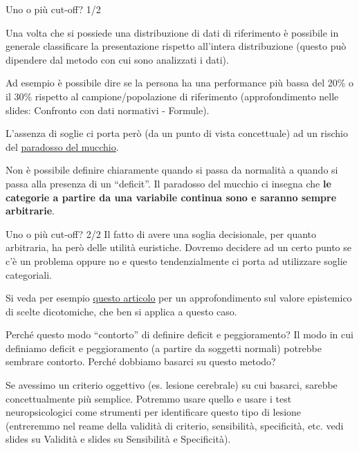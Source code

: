 \documentclass[
  ignorenonframetext,
  aspectratio=169,
]{beamer}
\begin{document}
\begin{frame}{Uno o più cut-off? 1/2}
\label{uno-o-piuxf9-cut-off-12}
\small

Una volta che si possiede una distribuzione di dati di riferimento è
possibile in generale classificare la presentazione rispetto all'intera
distribuzione (questo può dipendere dal metodo con cui sono analizzati i
dati).

Ad esempio è possibile dire se la persona ha una performance più bassa
del 20\% o il 30\% rispetto al campione/popolazione di riferimento
(approfondimento nelle slides: Confronto con dati normativi - Formule).

L'assenza di soglie ci porta però (da un punto di vista concettuale) ad
un rischio del
\href{https://it.wikipedia.org/wiki/Paradosso_del_sorite}{\ul{paradosso
del mucchio}}.

Non è possibile definire chiaramente quando si passa da normalità a
quando si passa alla presenza di un ``deficit''. Il paradosso del
mucchio ci insegna che \textbf{le categorie a partire da una variabile
continua sono e saranno sempre arbitrarie}.
\end{frame}

\begin{frame}{Uno o più cut-off? 2/2}
\label{uno-o-piuxf9-cut-off-22}
Il fatto di avere una soglia decisionale, per quanto arbitraria, ha però
delle utilità euristiche. Dovremo decidere ad un certo punto se c'è un
problema oppure no e questo tendenzialmente ci porta ad utilizzare
soglie categoriali.

Si veda per esempio
\href{https://journals.sagepub.com/doi/full/10.1177/09593543231160112}{\underline{questo articolo}}
per un approfondimento sul valore epistemico di scelte dicotomiche, che
ben si applica a questo caso.
\end{frame}

\begin{frame}{Perché questo modo ``contorto'' di definire deficit e
peggioramento?}
\label{perchuxe9-questo-modo-contorto-di-definire-deficit-e-peggioramento}
Il modo in cui definiamo deficit e peggioramento (a partire da soggetti
normali) potrebbe sembrare contorto. Perché dobbiamo basarci su questo
metodo?

Se avessimo un criterio oggettivo (es. lesione cerebrale) su cui
basarci, sarebbe concettualmente più semplice. Potremmo usare quello e
usare i test neuropsicologici come strumenti per identificare questo
tipo di lesione (entreremmo nel reame della validità di criterio,
sensibilità, specificità, etc. vedi slides su Validità e slides su
Sensibilità e Specificità).
\end{frame}
\end{document}
